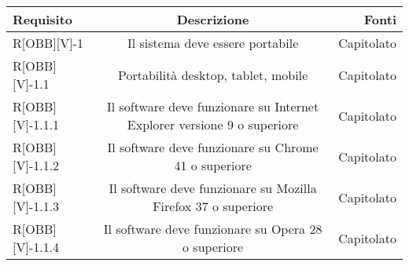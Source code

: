 \begin{center}
\begin{tabular}{|l|c|r|}
	\toprule
	
	\textbf{Requisito} & \textbf{Descrizione} & \textbf{Fonti} \\
	
	\midrule
	R[OBB][V]-1 & Il sistema deve essere portabile & Capitolato \\ \midrule
	R[OBB][V]-1.1 &	Portabilità desktop, tablet, mobile	& Capitolato\\  \midrule
	R[OBB][V]-1.1.1	& Il software deve funzionare su Internet Explorer versione 9 o superiore & Capitolato \\ \midrule
	R[OBB][V]-1.1.2	& Il software deve funzionare su Chrome 41 o superiore & Capitolato \\ \midrule
	R[OBB][V]-1.1.3 & Il software deve funzionare su Mozilla Firefox 37 o superiore & Capitolato  \\ \midrule
	R[OBB][V]-1.1.4	& Il software deve funzionare su Opera 28 o superiore & Capitolato\\ \midrule
	\bottomrule
\end{tabular}
\end{center}
	